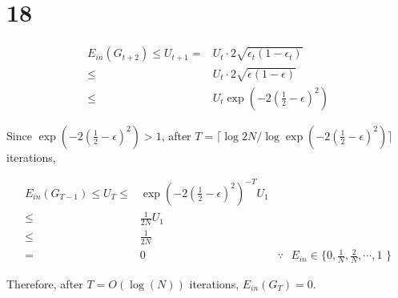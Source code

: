 \documentclass[fleqn,a4paper,12pt]{article}
\begin{document}
\section*{18}

\begin{align*}
  E_{in}(G_{t+2}) \leq U_{t+1}
  =& U_t \cdot 2 \sqrt{\epsilon_t(1 - \epsilon_t)} \\
  \leq& U_t \cdot 2 \sqrt{\epsilon(1 - \epsilon)} \\
  \leq& U_t \exp(-2 (\frac{1}{2} - \epsilon)^2 )
\end{align*}

Since $\exp(-2 (\frac{1}{2} - \epsilon)^2 ) > 1$, after $T = \lceil \log{2N} / \log{\exp(-2 (\frac{1}{2} - \epsilon)^2 )} \rceil$ iterations,

\begin{align*}
  E_{in}(G_{T - 1}) \leq U_{T} 
  \leq& \exp(-2 (\frac{1}{2} - \epsilon)^2 )^{-T} U_1 \\
  \leq& \frac{1}{2N} U_1 \\
  \leq& \frac{1}{2N} \\
  =& 0 & \because \text{ $E_{in} \in \{ 0, \frac{1}{N}, \frac{2}{N}, \cdots, 1$ \}}
\end{align*}

Therefore, after $T = O(\log(N))$ iterations, $E_{in}(G_T) = 0$.
\end{document}
